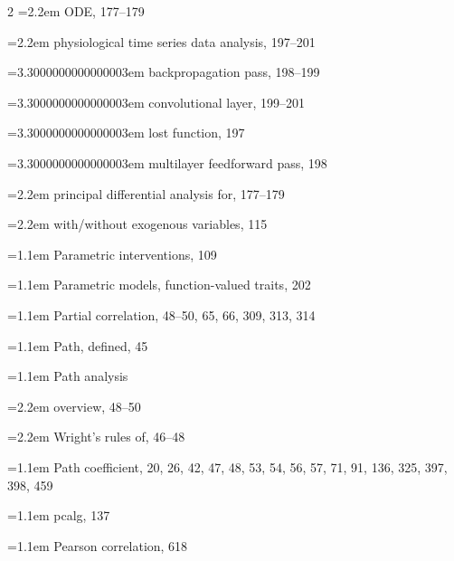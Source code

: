 \begin{multicols}{2}
\noindent\hangindent=2.2em \hspace*{1.1em}ODE, 177--179\par
\noindent\hangindent=2.2em \hspace*{1.1em}physiological time series data analysis, 197--201\par
\noindent\hangindent=3.3000000000000003em \hspace*{2.2em}backpropagation pass, 198--199\par
\noindent\hangindent=3.3000000000000003em \hspace*{2.2em}convolutional layer, 199--201\par
\noindent\hangindent=3.3000000000000003em \hspace*{2.2em}lost function, 197\par
\noindent\hangindent=3.3000000000000003em \hspace*{2.2em}multilayer feedforward pass, 198\par
\noindent\hangindent=2.2em \hspace*{1.1em}principal differential analysis for, 177--179\par
\noindent\hangindent=2.2em \hspace*{1.1em}with/without exogenous variables, 115\par
\noindent\hangindent=1.1em Parametric interventions, 109\par
\noindent\hangindent=1.1em Parametric models, function-valued traits, 202\par
\noindent\hangindent=1.1em Partial correlation, 48--50, 65, 66, 309, 313, 314\par
\noindent\hangindent=1.1em Path, defined, 45\par
\noindent\hangindent=1.1em Path analysis\par
\noindent\hangindent=2.2em \hspace*{1.1em}overview, 48--50\par
\noindent\hangindent=2.2em \hspace*{1.1em}Wright's rules of, 46--48\par
\noindent\hangindent=1.1em Path coefficient, 20, 26, 42, 47, 48, 53, 54, 56, 57, 71, 91, 136, 325, 397, 398, 459\par
\noindent\hangindent=1.1em pcalg, 137\par
\noindent\hangindent=1.1em Pearson correlation, 618\par

\end{multicols}

